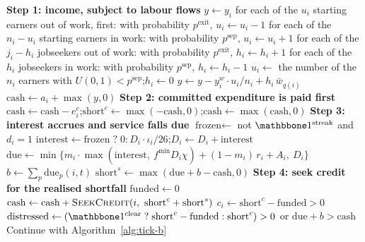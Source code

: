 \begin{algorithm}[!htbp]
\caption{Household tick, for household $i$ at tick $t$}
\label{alg:tick}
\begin{algorithmic}
\footnotesize
\State \textbf{Step 1: income, subject to labour flows}
\State $y \gets y_i$
\State for each of the $u_i$ starting earners out of work, first: with probability $p^{\text{exit}}$, $u_i \gets u_i - 1$
\State for each of the $n_i - u_i$ starting earners in work: with probability $p^{\text{sep}}$, $u_i \gets u_i + 1$
\State for each of the $j_i - h_i$ jobseekers out of work: with probability $p^{\text{exit}}$, $h_i \gets h_i + 1$
\State for each of the $h_i$ jobseekers in work: with probability $p^{\text{sep}}$, $h_i \gets h_i - 1$
 
\State $u_i \gets$ the number of the $n_i$ earners with $U(0,1) < p^{\text{sep}}$;\quad $h_i \gets 0$
\EndIf
\State $y \gets y - y^w_i \cdot u_i / n_i + h_i\, \bar{w}_{q(i)}$ 
\State $\text{cash} \gets a_i + \max(y, 0)$
\State \textbf{Step 2: committed expenditure is paid first}
\State $\text{cash} \gets \text{cash} - e^c_i$;\quad $\text{short}^c \gets \max(-\text{cash}, 0)$;\quad $\text{cash} \gets \max(\text{cash}, 0)$
\State \textbf{Step 3: interest accrues and service falls due}
\State $\text{frozen} \gets$ not $\ind^{\text{streak}}$ and $d_i = 1$ 
\State $\text{interest} \gets \text{frozen} \;?\; 0 : D_i \cdot \iota_i / 26$;\quad $D_i \gets D_i + \text{interest}$
\State $\text{due} \gets \min\{m_i \cdot \max(\text{interest},\ f^{\min} D_i \chi) + (1 - m_i)\, r_i + A_i,\ D_i\}$ 
\State $b \gets \sum_{p} \text{due}_p(i, t)$ 
\State $\text{short}^s \gets \max(\text{due} + b - \text{cash}, 0)$
\State \textbf{Step 4: seek credit for the realised shortfall}
\State $\text{funded} \gets 0$
    \State $\text{cash} \gets \text{cash} + \Call{SeekCredit}{i,\ \text{short}^c + \text{short}^s}$ 
\EndIf
\State $c_i \gets \text{short}^c - \text{funded} > 0$ 
\State $\text{distressed} \gets (\ind^{\text{clear}} \;?\; \text{short}^c - \text{funded} : \text{short}^c) > 0$ or $\text{due} + b > \text{cash}$ 
\State Continue with Algorithm~\ref{alg:tick-b}
\end{algorithmic}
\end{algorithm}

